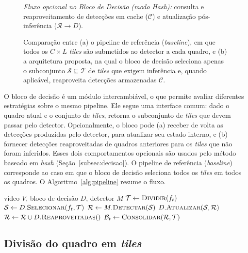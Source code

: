 \documentclass{ieeeaccess}
\begin{document}
\begin{figure}[t!]
{\vspace{1.5mm}
{\scriptsize \textit{Fluxo opcional no Bloco de Decisão (modo Hash):} consulta e reaproveitamento de detecções em cache ($\mathcal{C}$) e atualização pós-inferência ($\mathcal{R} \to D$).}
}
\caption{Comparação entre (a) o pipeline de referência (\textit{baseline}), em que todos os $C \times L$ \textit{tiles} são submetidos ao detector a cada quadro, e (b) a arquitetura proposta, na qual o bloco de decisão seleciona apenas o subconjunto $\mathcal{S} \subseteq \mathcal{T}$ de \textit{tiles} que exigem inferência e, quando aplicável, reaproveita detecções armazenadas $\mathcal{C}$.}
\label{fig:arquitetura}
\end{figure}

O bloco de decisão é um módulo intercambiável, o que permite avaliar diferentes estratégias sobre o mesmo pipeline. Ele segue uma interface comum: dado o quadro atual e o conjunto de \textit{tiles}, retorna o subconjunto de \textit{tiles} que devem passar pelo detector. Opcionalmente, o bloco pode (a) receber de volta as detecções produzidas pelo detector, para atualizar seu estado interno, e (b) fornecer detecções reaproveitadas de quadros anteriores para os \textit{tiles} que não foram inferidos. Esses dois comportamentos opcionais são usados pelo método baseado em \textit{hash} (Seção~\ref{subsec:decisao}). O pipeline de referência (\textit{baseline}) corresponde ao caso em que o bloco de decisão seleciona todos os \textit{tiles} em todos os quadros. O Algoritmo~\ref{alg:pipeline} resume o fluxo.

\begin{algorithm}[t]
\caption{Pipeline de inferência seletiva por \textit{tiles}}
\label{alg:pipeline}
\begin{algorithmic}[1]
\REQUIRE vídeo $V$, bloco de decisão $D$, detector $M$
  \STATE $\mathcal{T} \gets \textsc{Dividir}(f_t)$
  \STATE $\mathcal{S} \gets D.\textsc{Selecionar}(f_t, \mathcal{T})$
  \STATE $\mathcal{R} \gets M.\textsc{Detectar}(\mathcal{S})$ 
  \STATE $D.\textsc{Atualizar}(\mathcal{S}, \mathcal{R})$ 
  \STATE $\mathcal{R} \gets \mathcal{R} \cup D.\textsc{Reaproveitadas}()$ 
  \STATE $\mathcal{B}_t \gets \textsc{Consolidar}(\mathcal{R}, \mathcal{T})$
\ENDFOR
\end{algorithmic}
\end{algorithm}

\subsection{Divisão do quadro em \textit{tiles}}
\label{subsec:tiles}
\end{document}
